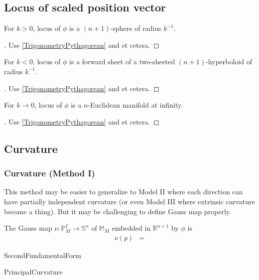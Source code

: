\documentclass[stu, babel, american, biblatex, a4paper, draftall]{apa7}
\begin{document}
\subsection{Locus of scaled position vector}
\begin{lemma}\label{SphericalLocus}
    For $k>0$, locus of $\phi$ is a $\left(n+1\right)$-sphere of radius $k^{-1}$.
\end{lemma}
\begin{proof}[]
    \skipped

    Use \cref{TrigonometryPythagorean} and et cetera.
\end{proof}
\begin{lemma}\label{HyperbolicLocus}
    For $k<0$, locus of $\phi$ is a forward sheet of a two-sheeted $\left(n+1\right)$-hyperboloid of radius $k^{-1}$.
\end{lemma}
\begin{proof}[]
    \skipped

    Use \cref{TrigonometryPythagorean} and et cetera.
\end{proof}
\begin{lemma}\label{EuclideanLocus}
    For $k\to0$, locus of $\phi$ is a $n$-Euclidean manifold at infinity.
\end{lemma}
\begin{proof}[]
    \skipped

    Use \cref{TrigonometryPythagorean} and et cetera.
\end{proof}
\subsection{Curvature}
\subsubsection{Curvature (Method I)}
This method may be easier to generalize to
Model II where each direction can have partially independent curvature
(or even Model III where extrinsic curvature become a thing).
But it may be challenging to define Gauss map properly.
\begin{GaussMap}
    The Gauss map $\nu:\mathbb{P}^I_M\to\mathbb{S}^{n}$ of $\mathbb{M}_M$ embedded in $\mathbb{R}^{n+1}$ by $\phi$ is
    \begin{align*}
        \nu\left(p\right) & =
    \end{align*}
\end{GaussMap}
\begin{SecondFundamental}
    SecondFundamentalForm
\end{SecondFundamental}
\begin{PrincipalCurvature}
    PrincipalCurvature
\end{PrincipalCurvature}
\end{document}
